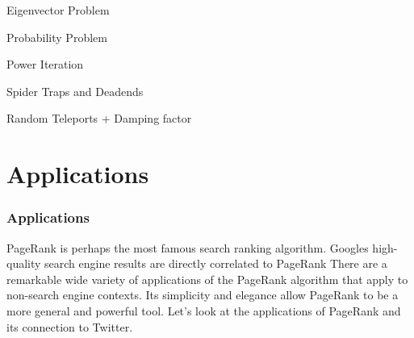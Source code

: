 \documentclass{beamer}
\begin{document}

\begin{frame}[t]{Eigenvector Problem}

\end{frame}

\begin{frame}[t]{Probability Problem}

\end{frame}

\begin{frame}[t]{Power Iteration}

\end{frame}

\begin{frame}[t]{Spider Traps and Deadends}

\end{frame}

\begin{frame}[t]{Random Teleports + Damping factor}
    
\end{frame}


\section{Applications}
\begin{frame}[t]
    \frametitle{Applications}
    \begin{outline}
        \1 PageRank is perhaps the most famous search ranking algorithm. Googles high-quality search engine results are directly correlated to PageRank
        \1 There are a remarkable wide variety of applications of the PageRank algorithm that apply to non-search engine contexts.
        \1 Its simplicity and elegance allow PageRank to be a more general and powerful tool.
        \1 Let's look at the applications of PageRank and its connection to Twitter.

    \end{outline}
\end{frame}
\end{document}
